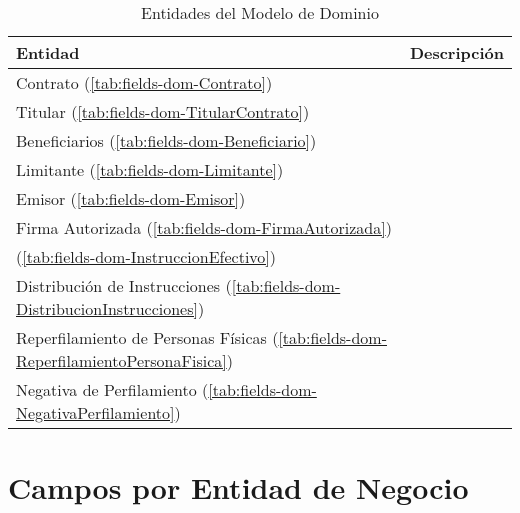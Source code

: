 \begin{table}[H]
	\caption{Entidades del Modelo de Dominio}
	\label{tab:entities}
	\begin{center}
	\begin{tabularx}{0.90\linewidth}{ X X }
		\hline
		\textbf{Entidad} & \textbf{Descripci\'on} \\
		\hline
		Contrato (\ref{tab:fields-dom-Contrato}) &  \\
		Titular (\ref{tab:fields-dom-TitularContrato}) &  \\
		Beneficiarios (\ref{tab:fields-dom-Beneficiario}) &  \\
		Limitante (\ref{tab:fields-dom-Limitante}) &  \\
		Emisor (\ref{tab:fields-dom-Emisor}) &  \\
		Firma Autorizada (\ref{tab:fields-dom-FirmaAutorizada}) &  \\
		 (\ref{tab:fields-dom-InstruccionEfectivo}) &  \\
		Distribuci\'on de Instrucciones (\ref{tab:fields-dom-DistribucionInstrucciones}) &  \\
		Reperfilamiento de Personas F\'isicas (\ref{tab:fields-dom-ReperfilamientoPersonaFisica}) &  \\
		Negativa de Perfilamiento (\ref{tab:fields-dom-NegativaPerfilamiento}) &  \\
		\hline
	\end{tabularx}
	\end{center}
\end{table}
\section{Campos por Entidad de Negocio} \label{sec:entity-fields-dominio}

